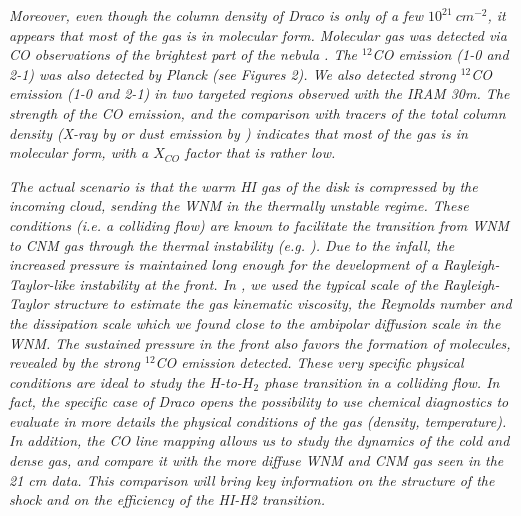 \documentclass[traditabstract]{aa}
\begin{document}
\textit{   Moreover, even though the column density of Draco is only of a few $10^{21}\: cm^{-2}$, it appears that most of the gas is in molecular form. Molecular gas was detected via CO observations of the brightest part of the nebula \citep{Mebold_1985,Rohlfs_1989}. The $^{12}$CO emission (1-0 and 2-1) was also detected by Planck (see Figures 2). We also detected strong $^{12}$CO emission (1-0 and 2-1) in two targeted regions observed with the IRAM 30m. The strength of the CO emission, and the comparison with tracers of the total column density (X-ray by \citealt{Moritz_1998} or dust emission by \citealt{Herbstmeier_1993,Planck_XXIV_2011}) indicates that most of the gas is in molecular form, with a $X_{CO}$ factor that is rather low.}

\textit{   The actual scenario is that the warm HI gas of the disk is compressed by the incoming cloud, sending the WNM in the thermally unstable regime. These conditions (i.e. a colliding flow) are known to facilitate the transition from WNM to CNM gas through the thermal instability (e.g. \citealt{Saury_2014}). Due to the infall, the increased pressure is maintained long enough for the development of a Rayleigh-Taylor-like instability at the front. In \cite{MAMD_2017b}, we used the typical scale of the Rayleigh-Taylor structure to estimate the gas kinematic viscosity, the Reynolds number and the dissipation scale which we found close to the ambipolar diffusion scale in the WNM.
%
   The sustained pressure in the front also favors the formation of molecules, revealed by the strong $^{12}$CO emission detected. These very specific physical conditions are ideal to study the H-to-$H_2$ phase transition in a colliding flow. In fact, the specific case of Draco opens the possibility to use chemical diagnostics to evaluate in more details the physical conditions of the gas (density, temperature). In addition, the CO line mapping allows us to study the dynamics of the cold and dense gas, and compare it with the more diffuse WNM and CNM gas seen in the 21 cm data. This comparison will bring key information on the structure of the shock and on the efficiency of the HI-H2 transition.}

%
%
\end{document}
